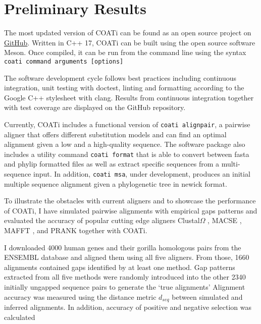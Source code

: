 \section{Preliminary Results}


The most updated version of COATi can be found as an open source project on
\href{https://www.github.com/jgarciamesa/coati}{GitHub}.
Written in C++ 17, COATi can be built using the open source software Meson.
Once compiled, it can be run from the command line using the syntax
\texttt{coati command arguments [options]}

The software development cycle follows best practices including continuous
integration, unit testing with doctest, linting and formatting according to the
Google C++ stylesheet with clang.
Results from continuous integration together with test coverage are displayed
on the GitHub repository.

Currently, COATi includes a functional version of \texttt{coati alignpair}, a
pairwise aligner that offers different substitution models and can find an
optimal alignment given a low and a high-quality sequence.
The software package also includes a utility command \verb|coati format| that is
able to convert between fasta and phylip formatted files as well as extract
specific sequences from a multi-sequence input.
In addition, \texttt{coati msa}, under development, produces an initial multiple
sequence alignment given a phylogenetic tree in newick format.

To illustrate the obstacles with current aligners and to showcase the
performance of COATi, I have simulated pairwise alignments with empirical gaps
patterns and evaluated the accuracy of popular cutting edge aligners
Clustal$\Omega$ \parencite{clustal_omega_sievers_2011}, MACSE
\parencite{ranwez_macse_2011}, MAFFT \parencite{mafft_katoh_2002}, and PRANK
\parencite{prank_loytynoja_2014} together with COATi.

I downloaded 4000 human genes and their gorilla homologous pairs from the
ENSEMBL database \parencite{ensembl_hubbard_2002} and aligned them using all
five aligners.
From those, 1660 alignments contained gaps identified by at least one method.
Gap patterns extracted from all five methods were randomly introduced into the
other 2340 initially ungapped sequence pairs to generate the `true alignments'
Alignment accuracy was measured using the distance metric $d_{seq}$
\parencite{metrics_blackburne_whelan_2011} between simulated and inferred
alignments.
In addition, accuracy of positive and negative selection was calculated %

